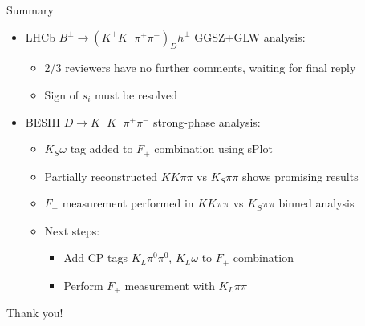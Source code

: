 \documentclass{beamer}
\begin{document}
\begin{frame}{Summary}
  \begin{itemize}
    \setlength\itemsep{1.5em}
    \item{LHCb $B^\pm\to(K^+K^-\pi^+\pi^-)_Dh^\pm$ GGSZ+GLW analysis:}
    \begin{itemize}
      \setlength\itemsep{0.5em}
      \item{2/3 reviewers have no further comments, waiting for final reply}
      \item{Sign of $s_i$ must be resolved}
    \end{itemize}
    \item{BESIII $D\to K^+K^-\pi^+\pi^-$ strong-phase analysis:}
    \begin{itemize}
      \setlength\itemsep{0.5em}
      \item{$K_S\omega$ tag added to $F_+$ combination using sPlot}
      \item{Partially reconstructed $KK\pi\pi$ vs $K_S\pi\pi$ shows promising results}
      \item{$F_+$ measurement performed in $KK\pi\pi$ vs $K_S\pi\pi$ binned analysis}
      \item{Next steps:}
      \begin{itemize}
        \item{Add CP tags $K_L\pi^0\pi^0$, $K_L\omega$ to $F_+$ combination}
        \item{Perform $F_+$ measurement with $K_L\pi\pi$}
      \end{itemize}
    \end{itemize}
  \end{itemize}
  \begin{center}
    \huge Thank you!
  \end{center}
\end{frame}
\end{document}
